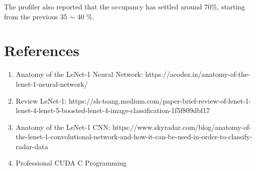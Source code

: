 \documentclass[a4paper]{report}
\begin{document}
The profiler also reported that the occupancy has settled around 70\%, starting from the previous 35 \( \sim \) 40 \%.

\section{References}

\begin{enumerate}
\item Anatomy of the LeNet-1 Neural Network: https://acodez.in/anatomy-of-the-lenet-1-neural-network/
\item Review LeNet-1: https://sh-tsang.medium.com/paper-brief-review-of-lenet-1-lenet-4-lenet-5-boosted-lenet-4-image-classification-1f5f809dbf17
\item Anatomy of the LeNet-1 CNN: https://www.skyradar.com/blog/anatomy-of-the-lenet-1-convolutional-network-and-how-it-can-be-used-in-order-to-classify-radar-data
\item Professional CUDA C Programming
\end{enumerate}
\end{document}
